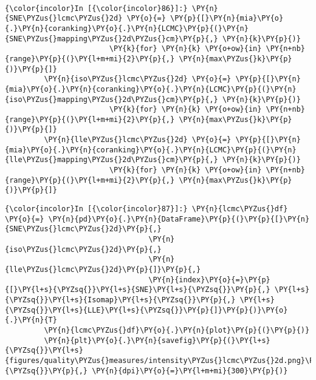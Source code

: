     \begin{center}
    \end{center}
    { \hspace*{\fill} \\}

    \begin{Verbatim}[commandchars=\\\{\}]
{\color{incolor}In [{\color{incolor}86}]:} \PY{n}{SNE\PYZus{}lcmc\PYZus{}2d} \PY{o}{=} \PY{p}{[}\PY{n}{mia}\PY{o}{.}\PY{n}{coranking}\PY{o}{.}\PY{n}{LCMC}\PY{p}{(}\PY{n}{SNE\PYZus{}mapping\PYZus{}2d\PYZus{}cm}\PY{p}{,} \PY{n}{k}\PY{p}{)}
                        \PY{k}{for} \PY{n}{k} \PY{o+ow}{in} \PY{n+nb}{range}\PY{p}{(}\PY{l+m+mi}{2}\PY{p}{,} \PY{n}{max\PYZus{}k}\PY{p}{)}\PY{p}{]}
         \PY{n}{iso\PYZus{}lcmc\PYZus{}2d} \PY{o}{=} \PY{p}{[}\PY{n}{mia}\PY{o}{.}\PY{n}{coranking}\PY{o}{.}\PY{n}{LCMC}\PY{p}{(}\PY{n}{iso\PYZus{}mapping\PYZus{}2d\PYZus{}cm}\PY{p}{,} \PY{n}{k}\PY{p}{)}
                        \PY{k}{for} \PY{n}{k} \PY{o+ow}{in} \PY{n+nb}{range}\PY{p}{(}\PY{l+m+mi}{2}\PY{p}{,} \PY{n}{max\PYZus{}k}\PY{p}{)}\PY{p}{]}
         \PY{n}{lle\PYZus{}lcmc\PYZus{}2d} \PY{o}{=} \PY{p}{[}\PY{n}{mia}\PY{o}{.}\PY{n}{coranking}\PY{o}{.}\PY{n}{LCMC}\PY{p}{(}\PY{n}{lle\PYZus{}mapping\PYZus{}2d\PYZus{}cm}\PY{p}{,} \PY{n}{k}\PY{p}{)}
                        \PY{k}{for} \PY{n}{k} \PY{o+ow}{in} \PY{n+nb}{range}\PY{p}{(}\PY{l+m+mi}{2}\PY{p}{,} \PY{n}{max\PYZus{}k}\PY{p}{)}\PY{p}{]}
\end{Verbatim}

    \begin{Verbatim}[commandchars=\\\{\}]
{\color{incolor}In [{\color{incolor}87}]:} \PY{n}{lcmc\PYZus{}df} \PY{o}{=} \PY{n}{pd}\PY{o}{.}\PY{n}{DataFrame}\PY{p}{(}\PY{p}{[}\PY{n}{SNE\PYZus{}lcmc\PYZus{}2d}\PY{p}{,}
                                 \PY{n}{iso\PYZus{}lcmc\PYZus{}2d}\PY{p}{,}
                                 \PY{n}{lle\PYZus{}lcmc\PYZus{}2d}\PY{p}{]}\PY{p}{,}
                                 \PY{n}{index}\PY{o}{=}\PY{p}{[}\PY{l+s}{\PYZsq{}}\PY{l+s}{SNE}\PY{l+s}{\PYZsq{}}\PY{p}{,} \PY{l+s}{\PYZsq{}}\PY{l+s}{Isomap}\PY{l+s}{\PYZsq{}}\PY{p}{,} \PY{l+s}{\PYZsq{}}\PY{l+s}{LLE}\PY{l+s}{\PYZsq{}}\PY{p}{]}\PY{p}{)}\PY{o}{.}\PY{n}{T}
         \PY{n}{lcmc\PYZus{}df}\PY{o}{.}\PY{n}{plot}\PY{p}{(}\PY{p}{)}
         \PY{n}{plt}\PY{o}{.}\PY{n}{savefig}\PY{p}{(}\PY{l+s}{\PYZsq{}}\PY{l+s}{figures/quality\PYZus{}measures/intensity\PYZus{}lcmc\PYZus{}2d.png}\PY{l+s}{\PYZsq{}}\PY{p}{,} \PY{n}{dpi}\PY{o}{=}\PY{l+m+mi}{300}\PY{p}{)}
\end{Verbatim}

